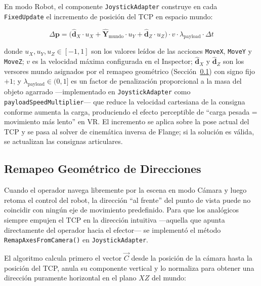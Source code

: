 En modo Robot, el componente \texttt{JoystickAdapter} construye en cada \texttt{FixedUpdate} el incremento de posición del TCP en espacio mundo:

\begin{equation}
    \Delta\mathbf{p} = \bigl(\hat{\mathbf{d}}_X \cdot u_X
                           + \hat{\mathbf{Y}}_{\text{mundo}} \cdot u_Y
                           + \hat{\mathbf{d}}_Z \cdot u_Z\bigr)
                       \cdot v \cdot \lambda_{\text{payload}} \cdot \Delta t
    \label{eq:delta_p}
\end{equation}

donde $u_X, u_Y, u_Z \in [-1,1]$ son los valores leídos de las acciones \texttt{MoveX}, \texttt{MoveY} y \texttt{MoveZ}; $v$ es la velocidad máxima configurada en el Inspector; $\hat{\mathbf{d}}_X$ y $\hat{\mathbf{d}}_Z$ son los versores mundo asignados por el remapeo geométrico (Sección~\ref{sec:remap}) con signo fijo $+1$; y $\lambda_{\text{payload}} \in (0, 1]$ es un factor de penalización proporcional a la masa del objeto agarrado ---implementado en \texttt{JoystickAdapter} como \texttt{payloadSpeedMultiplier}--- que reduce la velocidad cartesiana de la consigna conforme aumenta la carga, produciendo el efecto perceptible de ``carga pesada = movimiento más lento'' en VR. El incremento se aplica sobre la pose actual del TCP y se pasa al solver de cinemática inversa de Flange; si la solución es válida, se actualizan las consignas articulares.

\subsection{Remapeo Geométrico de Direcciones}
\label{sec:remap}

Cuando el operador navega libremente por la escena en modo Cámara y luego retoma el control del robot, la dirección ``al frente'' del punto de vista puede no coincidir con ningún eje de movimiento predefinido. Para que los analógicos siempre empujen el TCP en la dirección intuitiva ---aquella que apunta directamente del operador hacia el efector--- se implementó el método \texttt{RemapAxesFromCamera()} en \texttt{JoystickAdapter}.

El algoritmo calcula primero el vector $\overrightarrow{C}$ desde la posición de la cámara hasta la posición del TCP, anula su componente vertical y lo normaliza para obtener una dirección puramente horizontal en el plano $XZ$ del mundo:

